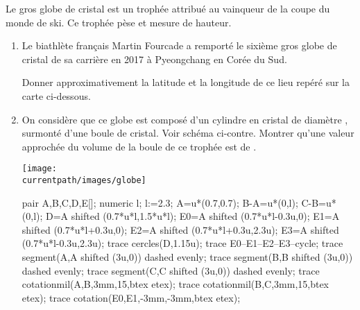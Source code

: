 \begin{exercice*}
    Le gros globe de cristal est un trophée attribué au vainqueur de la coupe du monde de ski.
    Ce trophée pèse  et mesure  de hauteur.

    \begin{enumerate}
        \item Le biathlète français Martin Fourcade a remporté le sixième gros globe de cristal de
        sa carrière en 2017 à Pyeongchang en Corée du Sud.

        Donner approximativement la latitude et la longitude de ce lieu repéré sur la carte ci-dessous.

        \hspace*{-10mm}
        \Cartographie[Projection,TypeProjection="winkel",VillesI={2,(130,35),"\noexpand\tiny Peyongchang",8},Echelle=1.5,Allegee=10]{}{}

        \item On considère que ce globe est composé d'un cylindre en cristal de diamètre , surmonté d'une boule de cristal.
        Voir schéma ci-contre. Montrer qu'une valeur approchée du volume de la boule de ce trophée est de .

        \begin{center}
            \begin{minipage}{0.4\linewidth}
                \vspace*{-10mm}
                \texttt{[image: \\currentpath/images/globe]}
            \end{minipage}            
            \begin{minipage}{0.4\linewidth}
                \begin{Geometrie}
                    pair A,B,C,D,E[];
                    numeric l;
                    l:=2.3;
                    A=u*(0.7,0.7);
                    B-A=u*(0,l);
                    C-B=u*(0,l);
                    D=A shifted (0.7*u*l,1.5*u*l);
                    E0=A shifted (0.7*u*l-0.3u,0);
                    E1=A shifted (0.7*u*l+0.3u,0);
                    E2=A shifted (0.7*u*l+0.3u,2.3u);
                    E3=A shifted (0.7*u*l-0.3u,2.3u);
                    trace cercles(D,1.15u);
                    trace E0--E1--E2--E3--cycle;
                    trace segment(A,A shifted (3u,0)) dashed evenly;
                    trace segment(B,B shifted (3u,0)) dashed evenly;
                    trace segment(C,C shifted (3u,0)) dashed evenly;
                    trace cotationmil(A,B,3mm,15,btex  etex);
                    trace cotationmil(B,C,3mm,15,btex  etex);
                    trace cotation(E0,E1,-3mm,-3mm,btex  etex);
                \end{Geometrie}
            \end{minipage}
        \end{center}
        

\end{enumerate}
\end{exercice*}
